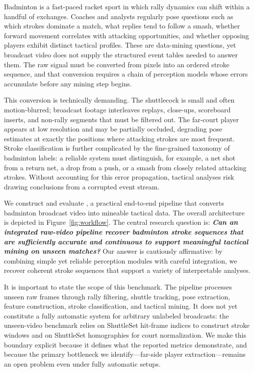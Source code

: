 Badminton is a fast-paced racket sport in which rally dynamics can shift within
a handful of exchanges. Coaches and analysts regularly pose questions such as
which strokes dominate a match, what replies tend to follow a smash, whether
forward movement correlates with attacking opportunities, and whether opposing
players exhibit distinct tactical profiles. These are data-mining questions, yet
broadcast video does not supply the structured event tables needed to answer
them. The raw signal must be converted from pixels into an ordered stroke
sequence, and that conversion requires a chain of perception models whose errors
accumulate before any mining step begins.

This conversion is technically demanding. The shuttlecock is small and often
motion-blurred; broadcast footage interleaves replays, close-ups, scoreboard
inserts, and non-rally segments that must be filtered out. The far-court player
appears at low resolution and may be partially occluded, degrading pose estimates
at exactly the positions where attacking strokes are most frequent. Stroke
classification is further complicated by the fine-grained taxonomy of badminton
labels: a reliable system must distinguish, for example, a net shot from a return
net, a drop from a push, or a smash from closely related attacking strokes.
Without accounting for this error propagation, tactical analyses risk drawing
conclusions from a corrupted event stream.

We construct and evaluate \method, a practical end-to-end pipeline that converts
badminton broadcast video into mineable tactical data. The overall architecture
is depicted in Figure~\ref{fig:workflow}. The central research question is:
\emph{\textbf{Can an integrated raw-video pipeline recover badminton stroke sequences
that are sufficiently accurate and continuous to support meaningful tactical
mining on unseen matches?}}  Our answer is cautiously affirmative: by combining
simple yet reliable perception modules with careful integration, we recover
coherent stroke sequences that support a variety of interpretable analyses.

It is important to state the scope of this benchmark. The pipeline processes
unseen raw frames through rally filtering, shuttle tracking, pose extraction,
feature construction, stroke classification, and tactical mining. It does not
yet constitute a fully automatic system for arbitrary unlabeled broadcasts: the
unseen-video benchmark relies on ShuttleSet hit-frame indices to construct
stroke windows and on ShuttleSet homographies for court normalization. We make
this boundary explicit because it defines what the reported metrics demonstrate,
and because the primary bottleneck we identify—far-side player extraction—remains
an open problem even under fully automatic setups.

